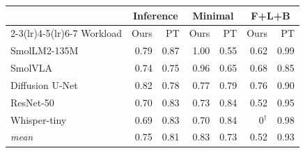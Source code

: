 \begin{tabular}{l rr rr rr}
\toprule
 & \multicolumn{2}{c}{Inference} & \multicolumn{2}{c}{Minimal} & \multicolumn{2}{c}{F+L+B} \\
\cmidrule(lr){2-3}\cmidrule(lr){4-5}\cmidrule(lr){6-7}
Workload & Ours & PT & Ours & PT & Ours & PT \\
\midrule
SmolLM2-135M & 0.79 & 0.87 & 1.00 & 0.55 & 0.62 & 0.99 \\
SmolVLA & 0.74 & 0.75 & 0.96 & 0.65 & 0.68 & 0.85 \\
Diffusion U-Net & 0.82 & 0.78 & 0.77 & 0.79 & 0.76 & 0.90 \\
ResNet-50 & 0.70 & 0.83 & 0.73 & 0.84 & 0.52 & 0.95 \\
Whisper-tiny & 0.69 & 0.83 & 0.70 & 0.84 & 0$^\dagger$ & 0.98 \\
\midrule
\textit{mean} & 0.75 & 0.81 & 0.83 & 0.73 & 0.52 & 0.93 \\
\bottomrule
\end{tabular}
